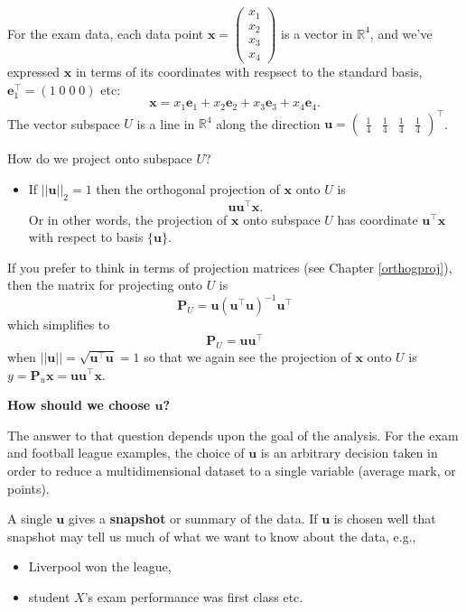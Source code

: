 \documentclass[
]{book}
\providecommand{\tightlist}{%
  \setlength{\itemsep}{0pt}\setlength{\parskip}{0pt}}
\theoremstyle{definition}
\theoremstyle{definition}
\theoremstyle{definition}
\theoremstyle{definition}
\theoremstyle{remark}
\begin{document}
For the exam data, each data point \(\mathbf x= \begin{pmatrix} x_1 \\ x_2 \\ x_3 \\ x_4 \end{pmatrix}\)
is a vector in \(\mathbb{R}^4\), and we've expressed \(\mathbf x\) in terms of its coordinates with respsect to the standard basis, \(\mathbf e_1^\top = (1\; 0\; 0 \; 0)\) etc:
\[\mathbf x=x_1 \mathbf e_1 + x_2 \mathbf e_2 +x_3 \mathbf e_3 +x_4 \mathbf e_4.\]
The vector subspace \(U\) is a line in \(\mathbb{R}^4\) along the direction \(\mathbf u= \begin{pmatrix} \frac{1}{4} & \frac{1}{4} & \frac{1}{4} & \frac{1}{4} \end{pmatrix}^\top\).

How do we project onto subspace \(U\)?

\begin{itemize}
\tightlist
\item
  If \(||\mathbf u||_2=1\) then the orthogonal projection of \(\mathbf x\) onto \(U\) is\\
  \[\mathbf u\mathbf u^\top\mathbf x.\]
  Or in other words, the projection of \(\mathbf x\) onto subspace \(U\) has coordinate \(\mathbf u^\top \mathbf x\) with respect to basis \(\{\mathbf u\}\).
\end{itemize}

If you prefer to think in terms of projection matrices (see Chapter \ref{orthogproj}), then the matrix for projecting onto \(U\) is
\[\mathbf P_U = \mathbf u(\mathbf u^\top \mathbf u)^{-1}\mathbf u^\top\]
which simplifies to
\[\mathbf P_U = \mathbf u\mathbf u^\top\]
when \(||\mathbf u||=\sqrt{\mathbf u^\top\mathbf u}=1\) so that we again see the projection of \(\mathbf x\) onto \(U\) is \(y=\mathbf P_u \mathbf x= \mathbf u\mathbf u^\top\mathbf x\).

\textbf{How should we choose \(\mathbf u\)?}

The answer to that question depends upon the goal of the analysis. For the exam and football league examples, the choice of \(\mathbf u\) is an arbitrary decision taken in order to reduce a multidimensional dataset to a single variable (average mark, or points).

A single \(\mathbf u\) gives a \textbf{snapshot} or summary of the data. If \(\mathbf u\) is chosen well that snapshot may tell us much of what we want to know about the data, e.g.,

\begin{itemize}
\tightlist
\item
  Liverpool won the league,
\item
  student \(X\)'s exam performance was first class etc.
\end{itemize}
\end{document}
